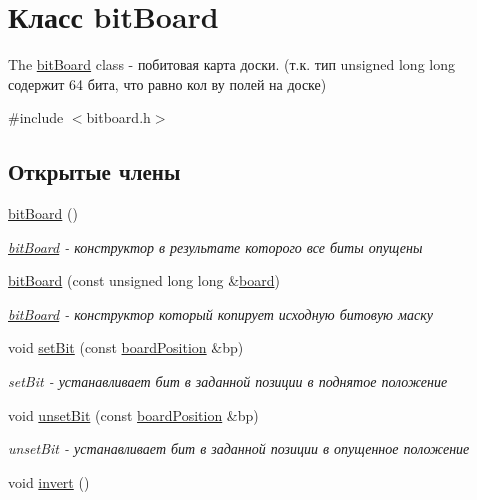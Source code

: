 \hypertarget{classbit_board}{}\section{Класс bit\+Board}
\label{classbit_board}


The \hyperlink{classbit_board}{bit\+Board} class -\/ побитовая карта доски. (т.\+к. тип unsigned long long содержит 64 бита, что равно кол ву полей на доске)  




{\ttfamily \#include $<$bitboard.\+h$>$}

\subsection*{Открытые члены}
\begin{DoxyCompactItemize}
\item 
\hypertarget{classbit_board_a1da2ef5a1d5e5ceb731dd5b7fbbbf386}{}\hyperlink{classbit_board_a1da2ef5a1d5e5ceb731dd5b7fbbbf386}{bit\+Board} ()\label{classbit_board_a1da2ef5a1d5e5ceb731dd5b7fbbbf386}

\begin{DoxyCompactList}\small\item\em \hyperlink{classbit_board}{bit\+Board} -\/ конструктор в результате которого все биты опущены \end{DoxyCompactList}\item 
\hyperlink{classbit_board_abac32dec74ed2dd32995955a07422198}{bit\+Board} (const unsigned long long \&\hyperlink{classboard}{board})
\begin{DoxyCompactList}\small\item\em \hyperlink{classbit_board}{bit\+Board} -\/ конструктор который копирует исходную битовую маску \end{DoxyCompactList}\item 
void \hyperlink{classbit_board_a3ec51b1e23ec2a8903c7f9fbf7e79889}{set\+Bit} (const \hyperlink{classboard_position}{board\+Position} \&bp)
\begin{DoxyCompactList}\small\item\em set\+Bit -\/ устанавливает бит в заданной позиции в поднятое положение \end{DoxyCompactList}\item 
void \hyperlink{classbit_board_a931987de9741781789d2dd20bd9aef62}{unset\+Bit} (const \hyperlink{classboard_position}{board\+Position} \&bp)
\begin{DoxyCompactList}\small\item\em unset\+Bit -\/ устанавливает бит в заданной позиции в опущенное положение \end{DoxyCompactList}\item 
\hypertarget{classbit_board_af8359ea0e11d66aa70667a521569c6f0}{}void \hyperlink{classbit_board_af8359ea0e11d66aa70667a521569c6f0}{invert} ()\label{classbit_board_af8359ea0e11d66aa70667a521569c6f0}


\end{DoxyCompactItemize}

